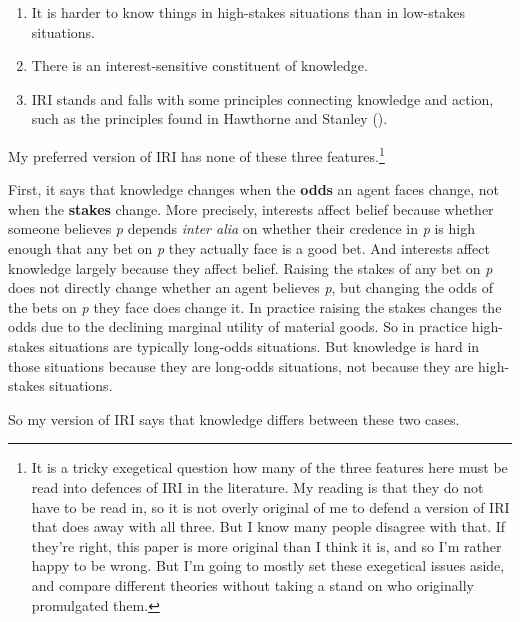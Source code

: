 \documentclass[
  11pt,
  letterpaper,
  DIV=11,
  numbers=noendperiod,
  twoside]{scrartcl}
\providecommand{\tightlist}{%
  \setlength{\itemsep}{0pt}\setlength{\parskip}{0pt}}
\begin{document}
\begin{enumerate}
\def\labelenumi{\arabic{enumi}.}
\tightlist
\item
  It is harder to know things in high-stakes situations than in
  low-stakes situations.
\item
  There is an interest-sensitive constituent of knowledge.
\item
  IRI stands and falls with some principles connecting knowledge and
  action, such as the principles found in Hawthorne and Stanley
  ().
\end{enumerate}

My preferred version of IRI has none of these three features.\footnote{It
  is a tricky exegetical question how many of the three features here
  must be read into defences of IRI in the literature. My reading is
  that they do not have to be read in, so it is not overly original of
  me to defend a version of IRI that does away with all three. But I
  know many people disagree with that. If they're right, this paper is
  more original than I think it is, and so I'm rather happy to be wrong.
  But I'm going to mostly set these exegetical issues aside, and compare
  different theories without taking a stand on who originally
  promulgated them.}

First, it says that knowledge changes when the \textbf{odds} an agent
faces change, not when the \textbf{stakes} change. More precisely,
interests affect belief because whether someone believes \emph{p}
depends \emph{inter alia} on whether their credence in \emph{p} is high
enough that any bet on \emph{p} they actually face is a good bet. And
interests affect knowledge largely because they affect belief. Raising
the stakes of any bet on \emph{p} does not directly change whether an
agent believes \emph{p}, but changing the odds of the bets on \emph{p}
they face does change it. In practice raising the stakes changes the
odds due to the declining marginal utility of material goods. So in
practice high-stakes situations are typically long-odds situations. But
knowledge is hard in those situations because they are long-odds
situations, not because they are high-stakes situations.

So my version of IRI says that knowledge differs between these two
cases.
\end{document}
